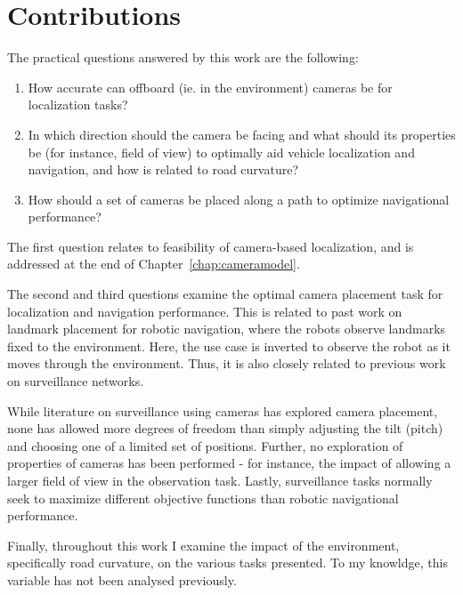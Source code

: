 \documentclass[a4paper,12pt,twoside,openright]{report}
\begin{document}
\section{Contributions}

The practical questions answered by this work are the following:
\begin{enumerate}
    \item How accurate can offboard (ie. in the environment) cameras be for localization tasks?
    \item In which direction should the camera be facing and what should its properties be (for instance, field of view)
          to optimally aid vehicle localization and navigation, and how is related to road curvature?
    \item How should a set of cameras be placed along a path to optimize navigational performance?
\end{enumerate}

The first question relates to feasibility of camera-based localization,
and is addressed at the end of Chapter~\ref{chap:cameramodel}.

The second and third questions examine the optimal camera placement task 
for localization and navigation performance. This is related to past work 
on landmark placement for robotic navigation, where the robots observe landmarks fixed to the environment. 
Here, the use case is inverted to observe the robot as it moves through the environment. 
Thus, it is also closely related to previous work on surveillance networks.

While literature on surveillance using cameras has explored camera placement, none 
has allowed more degrees of freedom than simply adjusting the tilt (pitch) 
and choosing one of a limited set of positions. Further, no exploration of 
properties of cameras has been performed - for instance, the impact
of allowing a larger field of view in the observation task. Lastly, surveillance
tasks normally seek to maximize different objective functions than robotic
navigational performance.

Finally, throughout this work I examine the impact of the environment, specifically
road curvature, on the various tasks presented. To my knowldge, this variable has not been
analysed previously.
\end{document}
